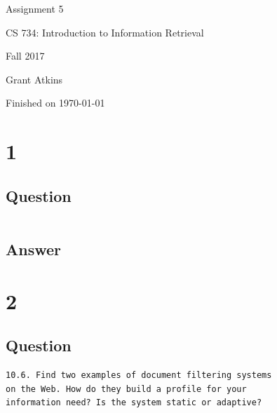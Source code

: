 \documentclass[letterpaper,11pt]{article}
\begin{document}
\begin{titlepage}

\begin{center}

\Huge{Assignment 5}

\Large{CS 734:  Introduction to Information Retrieval}

\Large{Fall 2017}

\Large{Grant Atkins}

\Large Finished on \today

\end{center}

\end{titlepage}

\newpage


\section*{1}

\subsection*{Question}

\begin{verbatim}

\end{verbatim}

\subsection*{Answer}




\clearpage

\section*{2}

\subsection*{Question}

\begin{verbatim}
10.6. Find two examples of document filtering systems 
on the Web. How do they build a profile for your
information need? Is the system static or adaptive?
\end{verbatim}
\end{document}
